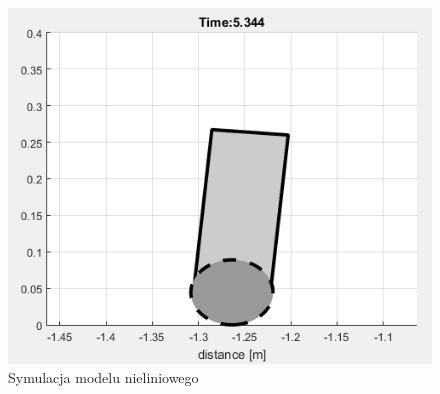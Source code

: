 \begin{figure}[h]
	\centering
	\includegraphics[scale=0.8]{visualisation_non_lin.PNG}
	\caption{Symulacja modelu nieliniowego}
	\label{fig:non_lin_res}
\end{figure}